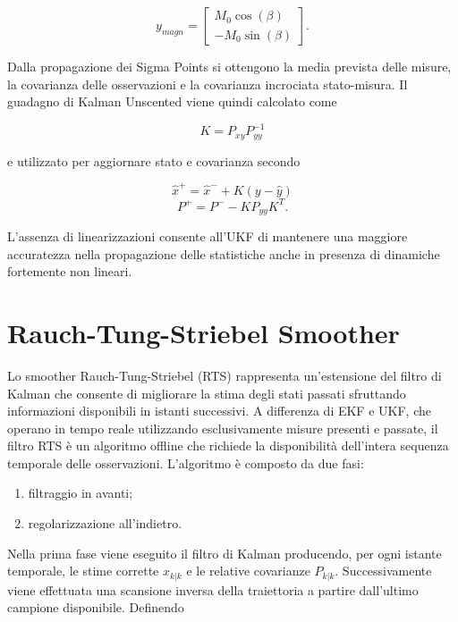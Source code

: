 \documentclass[12pt,a4paper]{article}
\begin{document}
\begin{equation}
y_{magn} =
\begin{bmatrix}
M_0\cos(\beta) \\
-M_0\sin(\beta)
\end{bmatrix}.
\end{equation}

Dalla propagazione dei Sigma Points si ottengono la media prevista delle misure, la covarianza delle osservazioni e la covarianza incrociata stato-misura.
Il guadagno di Kalman Unscented viene quindi calcolato come

\begin{equation}
K = P_{xy} P_{yy}^{-1}
\end{equation}

e utilizzato per aggiornare stato e covarianza secondo

\begin{equation}
\hat{x}^{+} = \hat{x}^{-} + K(y-\hat{y})
\end{equation}
\begin{equation}
P^{+} = P^{-} - K P_{yy} K^T.
\end{equation}

L'assenza di linearizzazioni consente all'UKF di mantenere una maggiore accuratezza
nella propagazione delle statistiche anche in presenza di dinamiche fortemente non lineari.

\section{Rauch-Tung-Striebel Smoother}
Lo smoother Rauch-Tung-Striebel (RTS) rappresenta un'estensione del filtro di Kalman che consente di migliorare la stima degli stati passati sfruttando informazioni disponibili in istanti successivi.
A differenza di EKF e UKF, che operano in tempo reale utilizzando esclusivamente misure presenti e passate, il filtro RTS è un algoritmo offline che richiede la disponibilità dell'intera sequenza temporale delle osservazioni.
L'algoritmo è composto da due fasi:
\begin{enumerate}
\item filtraggio in avanti;
\item regolarizzazione all'indietro.
\end{enumerate}
Nella prima fase viene eseguito il filtro di Kalman producendo, per ogni istante temporale, le stime corrette $\hat{x}_{k|k}$ e le relative covarianze $P_{k|k}$.
Successivamente viene effettuata una scansione inversa della traiettoria a partire dall'ultimo campione disponibile.
Definendo
\end{document}
